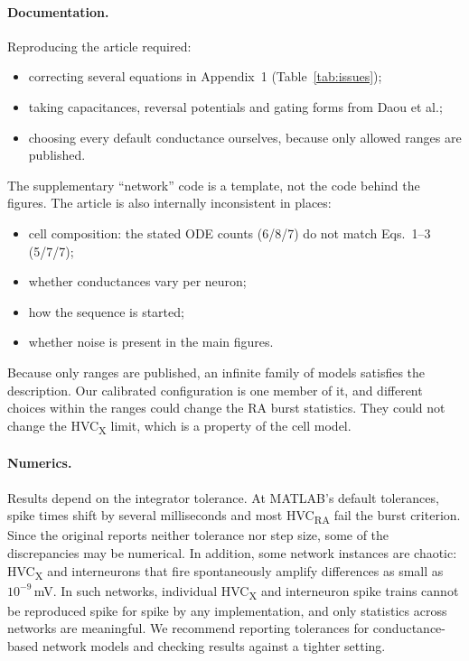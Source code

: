 \paragraph{Documentation.} Reproducing the article required:
\begin{itemize}
\item correcting several equations in Appendix~1 (Table~\ref{tab:issues});
\item taking capacitances, reversal potentials and gating forms from Daou et
  al.\supercite{Daou2013};
\item choosing every default conductance ourselves, because only allowed ranges are published.
\end{itemize}
The supplementary ``network'' code is a template, not the code behind the figures. The article
is also internally inconsistent in places:
\begin{itemize}
\item cell composition: the stated ODE counts (6/8/7) do not match Eqs.~1--3 (5/7/7);
\item whether conductances vary per neuron;
\item how the sequence is started;
\item whether noise is present in the main figures.
\end{itemize}
Because only ranges are published, an infinite family of models satisfies the description. Our
calibrated configuration is one member of it, and different choices within the ranges could
change the RA burst statistics. They could not change the HVC\textsubscript{X} limit, which is a
property of the cell model.

\paragraph{Numerics.} Results depend on the integrator tolerance. At MATLAB's default
tolerances, spike times shift by several milliseconds and most HVC\textsubscript{RA} fail the
burst criterion. Since the original reports neither tolerance nor step size, some of the
discrepancies may be numerical. In addition, some network instances are chaotic: HVC\textsubscript{X}
and interneurons that fire spontaneously amplify differences as small as $10^{-9}$\,mV. In such
networks, individual HVC\textsubscript{X} and interneuron spike trains cannot be reproduced spike
for spike by any implementation, and only statistics across networks are meaningful. We recommend reporting tolerances for conductance-based network
models and checking results against a tighter setting.

